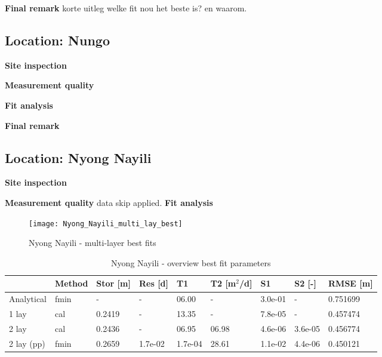 \textbf{Final remark}
korte uitleg welke fit nou het beste is? en waarom. 

\subsection{Location: Nungo}

\textbf{Site inspection}

\textbf{Measurement quality}

\textbf{Fit analysis}

\textbf{Final remark}

\subsection{Location: Nyong Nayili}


\textbf{Site inspection}

\textbf{Measurement quality}
data skip applied. 
\textbf{Fit analysis}

\begin{figure}[h!]
 \centering
 \texttt{[image: Nyong\_Nayili\_multi\_lay\_best]}
 \captionsetup{justification=centering} 
 \caption{Nyong Nayili - multi-layer best fits}
 \label{fig:Nyong_Nayili_best}
\end{figure}

\begin{table}[h!]
\small
\centering
\caption{Nyong Nayili - overview best fit parameters}
\label{tab:Nyong_Nayili_table}
\begin{tabular}{l|l|l|l|ll|ll|l}
\hline 
\textbf{}       & \textbf{Method} & \textbf{Stor [m]} & \textbf{Res [d]} & \textbf{T1}  & \textbf{T2   [m$^2$/d]}  & \textbf{S1}  & \textbf{S2 [-]}  & \textbf{RMSE [m]} \\ \hline \hline
Analytical                & fmin             & -             & -            & 06.00      & -          & 3.0e-01    & -          & 0.751699 \\
1 lay                     & cal              & 0.2419        & -            & 13.35      & -          & 7.8e-05    & -          & 0.457474 \\
2 lay                     & cal              & 0.2436        & -            & 06.95      & 06.98      & 4.6e-06    & 3.6e-05    & 0.456774 \\
2 lay (pp)                & fmin             & 0.2659        & 1.7e-02      & 1.7e-04    & 28.61      & 1.1e-02    & 4.4e-06    & 0.450121 \\ \hline    
\end{tabular}
\end{table}


